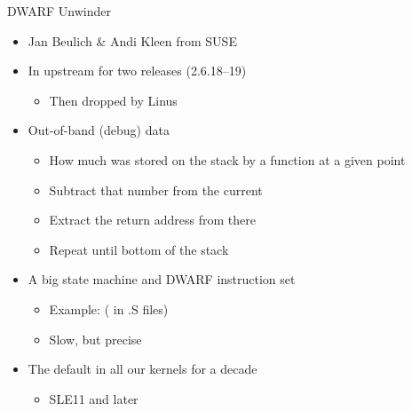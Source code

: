 \begin{frame}{DWARF Unwinder}

  \begin{itemize}[<+->]
    \item Jan Beulich \& Andi Kleen from SUSE
    \item In upstream for two releases (2.6.18--19)
    \begin{itemize}[<+->]
      \item Then dropped by Linus
    \end{itemize}

    \item Out-of-band (debug) data
    \begin{itemize}[<+->]
      \item How much was stored on the stack by a function at a given point
      \item Subtract that number from the current 
      \item Extract the return address from there
      \item Repeat until bottom of the stack
    \end{itemize}

    \item A big state machine and DWARF instruction set
    \begin{itemize}[<+->]
      \item Example:  ( in .S
	files)
      \item Slow, but precise
    \end{itemize}

    \item The default in all our kernels for a decade
    \begin{itemize}[<+->]
      \item SLE11 and later
    \end{itemize}
  \end{itemize}

\end{frame}

